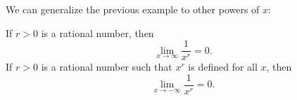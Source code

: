 \begin{frame}
We can generalize the previous example to other powers of $x$:
\begin{theorem}
If $r > 0$ is a rational number, then
\[
\lim_{x\to\infty} \frac{1}{x^r} = 0.
\]
If $r > 0$ is a rational number such that $x^r$ is defined for all $x$, then
\[
\lim_{x\to - \infty} \frac{1}{x^r} = 0.
\]
\end{theorem}
\end{frame}
